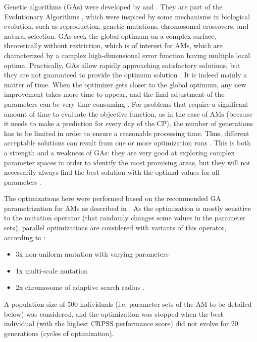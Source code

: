 \documentclass[review]{elsarticle}
\begin{document}
Genetic algorithms (GAs) were developed by \citet{Holland1992b} and \citet{Goldberg1989}. They are part of the Evolutionary Algorithms \citep{Back1993b, Schwefel1993}, which were inspired by some mechanisms in biological evolution, such as reproduction, genetic mutations, chromosomal crossovers, and natural selection. GAs seek the global optimum on a complex surface, theoretically without restriction, which is of interest for AMs, which are characterized by a complex high-dimensional error function having multiple local optima. Practically, GAs allow rapidly approaching satisfactory solutions, but they are not guaranteed to provide the optimum solution \citep{Zitzler2004a}. It is indeed mainly a matter of time. When the optimizer gets closer to the global optimum, any new improvement takes more time to appear, and the final adjustment of the parameters can be very time consuming \citep{Back1993a}. For problems that require a significant amount of time to evaluate the objective function, as in the case of AMs (because it needs to make a prediction for every day of the CP), the number of generations has to be limited in order to ensure a reasonable processing time. Thus, different acceptable solutions can result from one or more optimization runs \citep{Holland1992b}. This is both a strength and a weakness of GAs: they are very good at exploring complex parameter spaces in order to identify the most promising areas, but they will not necessarily always find the best solution with the optimal values for all parameters \citep{Holland1992b}.

The optimizations here were performed based on the recommended GA parametrization for AMs as described in \citet{Horton2016}. As the optimization is mostly sensitive to the mutation operator (that randomly changes some values in the parameter sets), parallel optimizations are considered with variants of this operator, according to \citet{Horton2016}:

\begin{itemize}
	\item 3x non-uniform mutation \citep{Michalewicz1996} with varying parameters
	\item 1x multi-scale mutation \citep{Horton2016}
	\item 2x chromosome of adaptive search radius \citep{Horton2016}.
\end{itemize}

A population size of 500 individuals (i.e. parameter sets of the AM to be detailed below) was considered, and the optimization was stopped when the best individual (with the highest CRPSS performance score) did not evolve for 20 generations (cycles of optimization).
\end{document}
